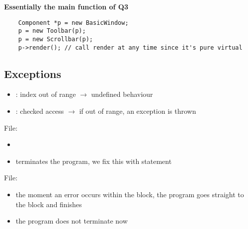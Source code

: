 \textbf{Essentially the main function of Q3}
\begin{lstlisting}
    Component *p = new BasicWindow;
    p = new Toolbar(p);
    p = new Scrollbar(p);
    p->render(); // call render at any time since it's pure virtual
\end{lstlisting}

\subsection{Exceptions}
\begin{itemize}
    \item {}: index out of range $ \rightarrow $ undefined behaviour
    \item {}: checked access $ \rightarrow $ if  out
          of range, an  exception is thrown
\end{itemize}

File: 
\begin{itemize}
    \item {}
    \item terminates the program, we fix this with  statement
\end{itemize}

File: 
\begin{itemize}
    \item the moment an error occurs within the  block, the program
          goes straight to the  block and finishes
    \item the program does not terminate now
\end{itemize}
